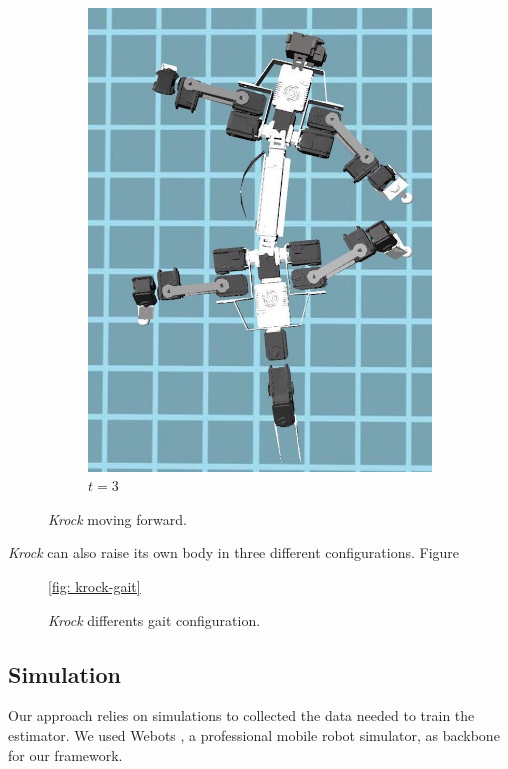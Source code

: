 \documentclass[../document.tex]{subfiles}
\begin{document}
\begin{figure}[H]
\begin{subfigure}[b]{0.3\textwidth}
			\includegraphics[width=\textwidth]{img/krock-moving-3}
			\caption{$t=3$}
	    \end{subfigure}	
	\label{fig: krock-moving}
	\caption{\emph{Krock} moving forward.}
	\end{figure}
\emph{Krock} can also raise its own body in three different configurations. Figure 


\begin{figure}
\ref{fig: krock-gait}
\caption{\emph{Krock} differents gait configuration.}	
\end{figure}
\subsection{Simulation}
Our approach relies on simulations to collected the data needed to train the estimator. We used Webots \cite{webots}, a professional 
mobile robot simulator, as backbone for our framework. 
\end{document}
